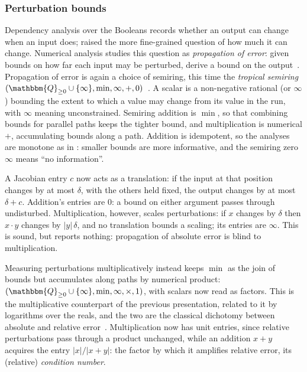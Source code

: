 \subsubsection{Perturbation bounds}
\label{sec:approx-as-tangents:perturbation-bounds}

Dependency analysis over the Booleans records whether an output can change when an input does;
 raised the more fine-grained question of how much it
can change. Numerical analysis studies this question as \emph{propagation of error}: given bounds on how far
each input may be perturbed, derive a bound on the output~\cite{high:ASNA2}. Propagation of error is again a
choice of semiring, this time the \emph{tropical semiring} $(\mathbbm{Q}_{\geq 0} \cup \{\infty\}, \min,
\infty, +, 0)$~\cite{simon88}. A scalar is a non-negative rational (or $\infty$) bounding the extent to which
a value may change from its value in the run, with $\infty$ meaning unconstrained. Semiring addition is
$\min$, so that combining bounds for parallel paths keeps the tighter bound, and multiplication is numerical
$+$, accumulating bounds along a path. Addition is idempotent, so the analyses are monotone as in
: smaller bounds are more informative, and the semiring zero
$\infty$ means ``no information''.

A Jacobian entry $c$ now acts as a translation: if the input at that position changes by at most
$\delta$, with the others held fixed, the output changes by at most $\delta + c$. Addition's entries are $0$: a
bound on either argument passes through undisturbed. Multiplication, however, scales perturbations: if $x$
changes by $\delta$ then $x \cdot y$ changes by $|y|\,\delta$, and no translation bounds a scaling; its
entries are $\infty$. This is sound, but reports nothing: propagation of absolute error is blind to
multiplication.

Measuring perturbations multiplicatively instead keeps $\min$ as the join of bounds but accumulates
along paths by numerical product: $(\mathbbm{Q}_{\geq 0}
\cup \{\infty\}, \min, \infty, \times, 1)$, with scalars now read as factors. This is the
multiplicative counterpart of the previous presentation, related to it by logarithms over the reals, and the
two are the classical dichotomy between absolute and relative error~\cite[\S\S 1.6--1.7]{high:ASNA2}.
Multiplication now has unit entries, since relative perturbations pass through a product unchanged, while an
addition $x + y$ acquires the entry $|x| / |x + y|$: the factor by which it amplifies relative error, its
(relative) \emph{condition number}.

